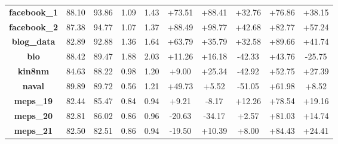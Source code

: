 \documentclass{article}
\begin{document}
\begin{appendices}
\begin{table}[htbp]
{\begin{tabular}{cccccccccc}
    \textbf{facebook\_1} & 88.10  & 93.86  & 1.09  & 1.43  & \textcolor[rgb]{ 0,  .502,  0}{+73.51} & \textcolor[rgb]{ 0,  .502,  0}{+88.41} & \textcolor[rgb]{ 0,  .502,  0}{+32.76} & \textcolor[rgb]{ 0,  .502,  0}{+76.86} & \textcolor[rgb]{ 0,  .502,  0}{+38.15} \\
    \textbf{facebook\_2} & 87.38  & 94.77  & 1.07  & 1.37  & \textcolor[rgb]{ 0,  .502,  0}{+88.49} & \textcolor[rgb]{ 0,  .502,  0}{+98.77} & \textcolor[rgb]{ 0,  .502,  0}{+42.68} & \textcolor[rgb]{ 0,  .502,  0}{+82.77} & \textcolor[rgb]{ 0,  .502,  0}{+57.24} \\
    \textbf{blog\_data} & 82.89  & 92.88  & 1.36  & 1.64  & \textcolor[rgb]{ 0,  .502,  0}{+63.79} & \textcolor[rgb]{ 0,  .502,  0}{+35.79} & \textcolor[rgb]{ 0,  .502,  0}{+32.58} & \textcolor[rgb]{ 0,  .502,  0}{+89.66} & \textcolor[rgb]{ 0,  .502,  0}{+41.74} \\
    \textbf{bio} & 88.42  & 89.47  & 1.88  & 2.03  & \textcolor[rgb]{ 0,  .502,  0}{+11.26} & \textcolor[rgb]{ 0,  .502,  0}{+16.18} & \textcolor[rgb]{ 1,  0,  0}{-42.33} & \textcolor[rgb]{ 0,  .502,  0}{+43.76} & \textcolor[rgb]{ 1,  0,  0}{-25.75} \\
    \textbf{kin8nm} & 84.63  & 88.22  & 0.98  & 1.20  & \textcolor[rgb]{ 0,  .502,  0}{+9.00} & \textcolor[rgb]{ 0,  .502,  0}{+25.34} & \textcolor[rgb]{ 1,  0,  0}{-42.92} & \textcolor[rgb]{ 0,  .502,  0}{+52.75} & \textcolor[rgb]{ 0,  .502,  0}{+27.39} \\
    \textbf{naval} & 89.89  & 89.72  & 0.56  & 1.21  & \textcolor[rgb]{ 0,  .502,  0}{+49.73} & \textcolor[rgb]{ 0,  .502,  0}{+5.52} & \textcolor[rgb]{ 1,  0,  0}{-51.05} & \textcolor[rgb]{ 0,  .502,  0}{+61.98} & \textcolor[rgb]{ 0,  .502,  0}{+8.52} \\
    \textbf{meps\_19} & 82.44  & 85.47  & 0.84  & 0.94  & \textcolor[rgb]{ 0,  .502,  0}{+9.21} & \textcolor[rgb]{ 1,  0,  0}{-8.17} & \textcolor[rgb]{ 0,  .502,  0}{+12.26} & \textcolor[rgb]{ 0,  .502,  0}{+78.54} & \textcolor[rgb]{ 0,  .502,  0}{+19.16} \\
    \textbf{meps\_20} & 82.81  & 86.02  & 0.86  & 0.96  & \textcolor[rgb]{ 1,  0,  0}{-20.63} & \textcolor[rgb]{ 1,  0,  0}{-34.17} & \textcolor[rgb]{ 0,  .502,  0}{+2.57} & \textcolor[rgb]{ 0,  .502,  0}{+81.03} & \textcolor[rgb]{ 0,  .502,  0}{+14.74} \\
    \textbf{meps\_21} & 82.50  & 82.51  & 0.86  & 0.94  & \textcolor[rgb]{ 1,  0,  0}{-19.50} & \textcolor[rgb]{ 0,  .502,  0}{+10.39} & \textcolor[rgb]{ 0,  .502,  0}{+8.00} & \textcolor[rgb]{ 0,  .502,  0}{+84.43} & \textcolor[rgb]{ 0,  .502,  0}{+24.41} \\
    

\end{tabular}}
\end{table}
\end{appendices}
\end{document}
